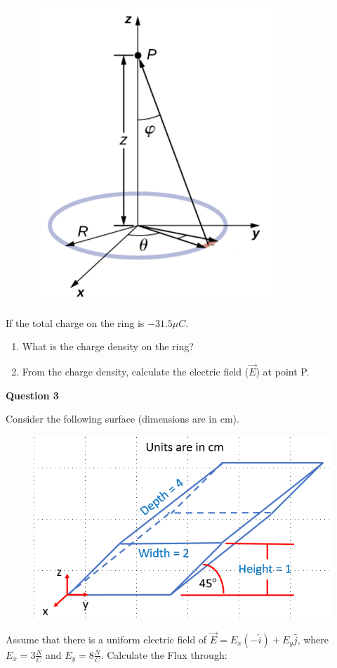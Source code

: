 \documentclass[14pt]{report}
\begin{document}
\begin{figure}[H]
\begin{center}
\includegraphics[scale=0.40]{exam1_2.png}
\end{center}
\end{figure}

If the total charge on the ring is $-31.5 \mu C$. 

\begin{enumerate}[label=\Alph*]
\item What is the charge density on the ring?
\item From the charge density, calculate the electric field ($\vec{E}$) at point P.
\end{enumerate}

\newpage
\textbf{Question 3}

Consider the following surface (dimensions are in cm). 

\begin{figure}[H]
\begin{center}
\includegraphics[scale=0.40]{exam1_4.png}
\end{center}
\end{figure}
Assume that there is a uniform electric field of $\vec{E} = E_x (-\hat{i}) + E_y \hat{j}$, where $E_x = 3 \frac{N}{C} $ and $E_y = 8 \frac{N}{C}$. Calculate the Flux through:
\end{document}
